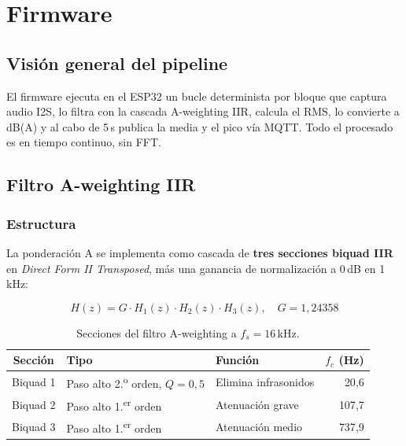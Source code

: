 \documentclass[11pt,a4paper,openany]{report}
\begin{document}
\chapter{Firmware}
\label{cap:firmware}

\section{Visi\'on general del pipeline}

El firmware ejecuta en el ESP32 un bucle determinista por bloque que captura audio I2S, lo filtra con la cascada A-weighting IIR, calcula el RMS, lo convierte a dB(A) y al cabo de 5\,s publica la media y el pico v\'ia MQTT. Todo el procesado es en tiempo continuo, sin FFT.

\section{Filtro A-weighting IIR}
\label{sec:firmware-dsp}

\subsection{Estructura}

La ponderaci\'on A se implementa como cascada de \textbf{tres secciones biquad IIR} en \emph{Direct Form II Transposed}, m\'as una ganancia de normalizaci\'on a 0\,dB en 1\,kHz:

\begin{equation}
H(z) = G \cdot H_1(z) \cdot H_2(z) \cdot H_3(z), \quad G = 1{,}24358
\end{equation}

\begin{table}[H]
\centering
{}
\begin{tabularx}{\textwidth}{c l X r}
\toprule
\rowcolor{TableHead}
\textbf{Secci\'on} & \textbf{Tipo} & \textbf{Funci\'on} & \textbf{$f_c$ (Hz)} \\ \midrule
Biquad 1 & Paso alto 2.\textsuperscript{o} orden, $Q=0{,}5$ & Elimina infrasonidos &  20{,}6 \\
Biquad 2 & Paso alto 1.\textsuperscript{er} orden          & Atenuaci\'on grave   & 107{,}7 \\
Biquad 3 & Paso alto 1.\textsuperscript{er} orden          & Atenuaci\'on medio    & 737{,}9 \\ \bottomrule
\end{tabularx}
\caption{Secciones del filtro A-weighting a $f_s = 16$\,kHz.}
\end{table}
\end{document}
